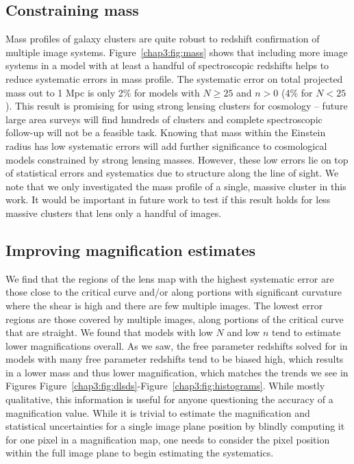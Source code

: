 \subsection{Constraining mass}
Mass profiles of galaxy clusters are quite robust to redshift confirmation of multiple image systems. Figure~\ref{chap3:fig:mass} shows that including more image systems in a model with at least a handful of spectroscopic redshifts helps to reduce systematic errors in mass profile. The systematic error on total projected mass out to 1 Mpc is only 2\% for models with $N\geq25$ and $n>0$ (4\% for $N<25$). This result is promising for using strong lensing clusters for cosmology -- future large area surveys will find hundreds of clusters and complete spectroscopic follow-up will not be a feasible task. Knowing that mass within the Einstein radius has low systematic errors will add further significance to cosmological models constrained by strong lensing masses. However, these low errors lie on top of statistical errors and systematics due to structure along the line of sight. We note that we only investigated the mass profile of a single, massive cluster in this work. It would be important in future work to test if this result holds for less massive clusters that lens only a handful of images.

\subsection{Improving magnification estimates}
We find that the regions of the lens map with the highest systematic error are those close to the critical curve and/or along portions with significant curvature where the shear is high and there are few multiple images. The lowest error regions are those covered by multiple images, along portions of the critical curve that are straight. We found that models with low $N$ and low $n$ tend to estimate lower magnifications overall. As we saw, the free parameter redshifts solved for in models with many free parameter redshifts tend to be biased high, which results in a lower mass and thus lower magnification, which matches the trends we see in Figures Figure~\ref{chap3:fig:dlsds}-Figure~\ref{chap3:fig:histograms}. While mostly qualitative, this information is useful for anyone questioning the accuracy of a magnification value. While it is trivial to estimate the magnification and statistical uncertainties for a single image plane position by blindly computing it for one pixel in a magnification map, one needs to consider the pixel position within the full image plane to begin estimating the systematics.

